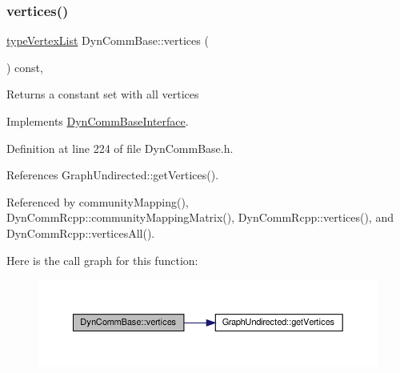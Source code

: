 \subsubsection{\texorpdfstring{vertices()}{vertices()}\hspace{0.1cm}{\footnotesize\ttfamily [1/2]}}
{\footnotesize\ttfamily \hyperlink{graphInterface_8h_a21d54d8a139def524d3b0d6f71ec4974}{type\+Vertex\+List} Dyn\+Comm\+Base\+::vertices (\begin{DoxyParamCaption}{ }\end{DoxyParamCaption}) const\hspace{0.3cm}{\ttfamily [inline]}, {\ttfamily [virtual]}}

\begin{DoxyReturn}{Returns}
a constant set with all vertices 
\end{DoxyReturn}


Implements \hyperlink{classDynCommBaseInterface_af5023d7b81f4413cc8052df01067f71f}{Dyn\+Comm\+Base\+Interface}.



Definition at line 224 of file Dyn\+Comm\+Base.\+h.



References Graph\+Undirected\+::get\+Vertices().



Referenced by community\+Mapping(), Dyn\+Comm\+Rcpp\+::community\+Mapping\+Matrix(), Dyn\+Comm\+Rcpp\+::vertices(), and Dyn\+Comm\+Rcpp\+::vertices\+All().

Here is the call graph for this function\+:
\nopagebreak
\begin{figure}[H]
\begin{center}
\leavevmode
\includegraphics[width=350pt]{classDynCommBase_ae240fba572935f26a72f73e39e115169_cgraph}
\end{center}
\end{figure}
\mbox{\label{classDynCommBase_ae56cd1fc5a69fcd4d0e0a073f3f2e36b}} 
